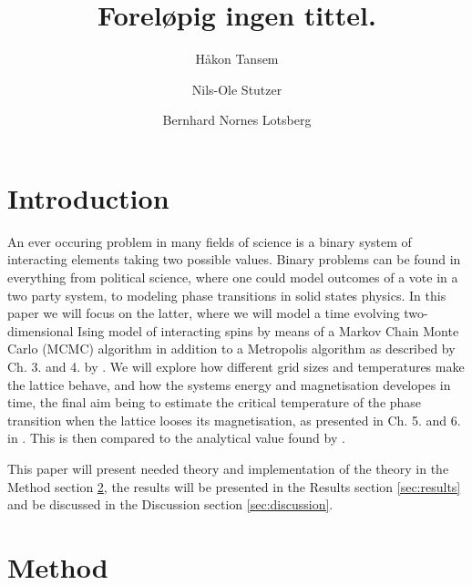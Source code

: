 \documentclass[twocolumn]{aastex62}
\begin{document}
\title{\Large Foreløpig ingen tittel.}

\author{Håkon Tansem}

\author{Nils-Ole Stutzer}

\author{Bernhard Nornes Lotsberg}

\begin{abstract}

\end{abstract}

\section{Introduction} \label{sec:intro}
An ever occuring problem in many fields of science is a binary system of
interacting elements taking two possible values. Binary problems can be found in
everything from political science, where one could model outcomes of a vote in a
two party system, to modeling phase transitions in solid states physics. In this
paper we will focus on the latter, where we will model a time evolving
two-dimensional Ising model of interacting spins by means of a Markov Chain
Monte Carlo (MCMC) algorithm in addition to a Metropolis algorithm as described
by Ch. 3. and 4. by \cite{newman:2019}. We will explore how
different grid sizes and temperatures make the lattice behave, and how the systems energy and magnetisation
developes in time, the final aim being to estimate the critical temperature of
the phase transition when the lattice looses its magnetisation, as presented in
Ch. 5. and 6. in \cite{plischke:2006}. This is then
compared to the analytical value found by \cite{onsager:1944}. 

This paper will present needed theory and implementation of the theory in the Method
section \ref{sec:method}, the results will be presented in the Results section
\ref{sec:results} and be discussed in the Discussion section
\ref{sec:discussion}.

\section{Method} \label{sec:method}
\end{document}

